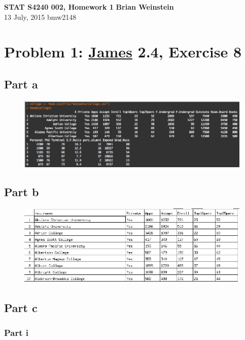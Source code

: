 \documentclass[11pt]{article}
\begin{document}
\noindent
\large\textbf{STAT S4240 002, Homework 1} \hfill \textbf{Brian Weinstein}\\
\normalsize 13 July, 2015 \hfill  bmw2148\\


\section*{Problem 1: \href{http://www-bcf.usc.edu/~gareth/ISL/}{James} 2.4, Exercise 8}

\subsection*{Part a}

\begin{figure}[H]
	\centering
	\includegraphics[width=6.5in]{8a.jpeg}
\end{figure}


\subsection*{Part b}

\begin{figure}[H]
	\centering
	\includegraphics[width=6.5in]{8b.jpeg}
\end{figure}

\subsection*{Part c}

\subsubsection*{Part i}
\end{document}
